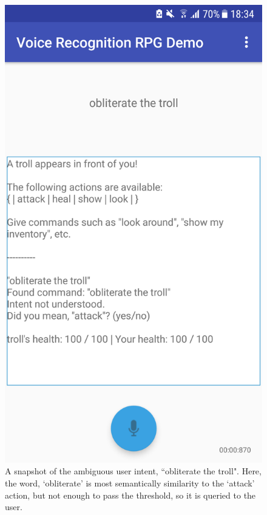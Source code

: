 \documentclass[11pt]{article}
\begin{document}
\begin{figure}
\begin{center}
  \includegraphics[scale=0.25]{Screenshot_20180522-183411.png}
  \caption{A snapshot of the ambiguous user intent, ``obliterate the troll". Here, the word, `obliterate' is most semantically similarity to the `attack' action, but not enough to pass the threshold, so it is queried to the user.}
  \label{fig:snapshot-suggestion}
  \end{center}
\end{figure}
\end{document}
